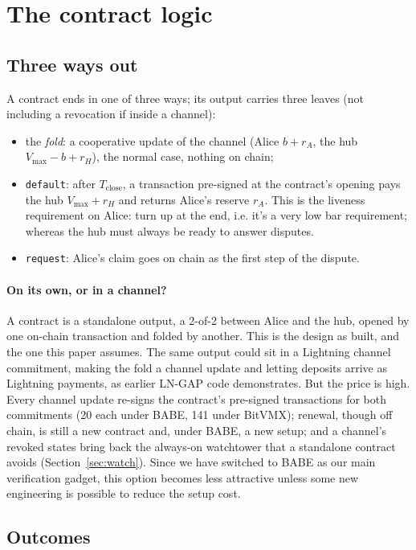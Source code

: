 \documentclass[11pt]{article}
\newcommand{\vmax}{V_{\max}}
\newcommand{\Tc}{T_{\mathrm{close}}}
\newcommand{\tx}[1]{\texttt{#1}}
\begin{document}
\section{The contract logic}
\label{sec:contract}

\subsection{Three ways out}

A contract ends in one of three ways; its output carries three leaves (not including a revocation if inside a channel):
\begin{itemize}[leftmargin=1.5em]
\item the \emph{fold}: a cooperative update of the channel (Alice
  $b + r_A$, the hub $\vmax - b + r_H$), the normal case, nothing on
  chain;
\item \tx{default}: after $\Tc$, a transaction pre-signed at the
  contract's opening pays the hub $\vmax + r_H$ and returns Alice's
  reserve $r_A$. This is the liveness requirement on Alice: turn up at the end, i.e. it's a very low bar requirement; whereas the hub must always be ready to answer disputes.
\item \tx{request}: Alice's claim goes on chain
  as the first step of the dispute.
\end{itemize}

\paragraph{On its own, or in a channel?} A contract is a standalone
output, a 2-of-2 between Alice and the hub, opened by one on-chain
transaction and folded by another. This is the design as built, and the
one this paper assumes. The same output could sit in a Lightning channel
commitment, making the fold a channel update and letting deposits arrive
as Lightning payments, as earlier LN-GAP code demonstrates. But the
price is high. Every channel update re-signs the contract's pre-signed
transactions for both commitments (20 each under BABE, 141 under
BitVMX); renewal,
though off chain, is still a new contract and, under BABE, a new setup;
and a channel's revoked states bring back the always-on watchtower that a
standalone contract avoids (Section~\ref{sec:watch}). Since we have switched to BABE as our main verification gadget, this option becomes less attractive unless some new engineering is possible to reduce the setup cost.
\subsection{Outcomes}
\label{sec:outcomes}
\end{document}
